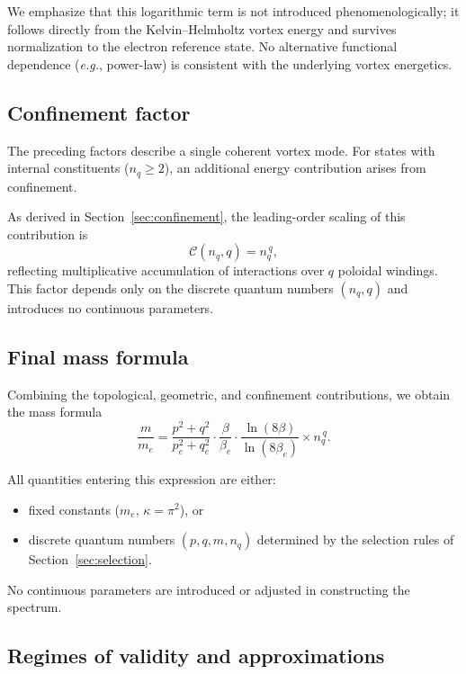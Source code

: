 \documentclass[11pt,a4paper]{article}
\begin{document}
We emphasize that this logarithmic term is not introduced
phenomenologically; it follows directly from the Kelvin--Helmholtz
vortex energy and survives normalization to the electron reference
state.  No alternative functional dependence (\textit{e.g.}, power-law) is
consistent with the underlying vortex energetics.

\subsection{Confinement factor}

The preceding factors describe a single coherent vortex mode.  For
states with internal constituents ($n_q \ge 2$), an additional
energy contribution arises from confinement.

As derived in Section~\ref{sec:confinement}, the leading-order
scaling of this contribution is
\begin{equation}
  \mathcal{C}(n_q,q) = n_q^{\,q},
\end{equation}
reflecting multiplicative accumulation of interactions over $q$
poloidal windings.  This factor depends only on the discrete
quantum numbers $(n_q,q)$ and introduces no continuous parameters.

\subsection{Final mass formula}

Combining the topological, geometric, and confinement contributions,
we obtain the mass formula
\begin{equation}
  \frac{m}{m_e}
  = \frac{p^2 + q^2}{p_e^2 + q_e^2}
  \cdot \frac{\beta}{\beta_e}
  \cdot \frac{\ln(8\beta)}{\ln(8\beta_e)}
  \times n_q^{\,q}.
  \label{eq:mass_formula}
\end{equation}

All quantities entering this expression are either:
\begin{itemize}
  \item fixed constants ($m_e$, $\kappa = \pi^2$), or
  \item discrete quantum numbers $(p,q,m,n_q)$ determined by the
        selection rules of Section~\ref{sec:selection}.
\end{itemize}

No continuous parameters are introduced or adjusted in constructing
the spectrum.

\subsection{Regimes of validity and approximations}
\end{document}
